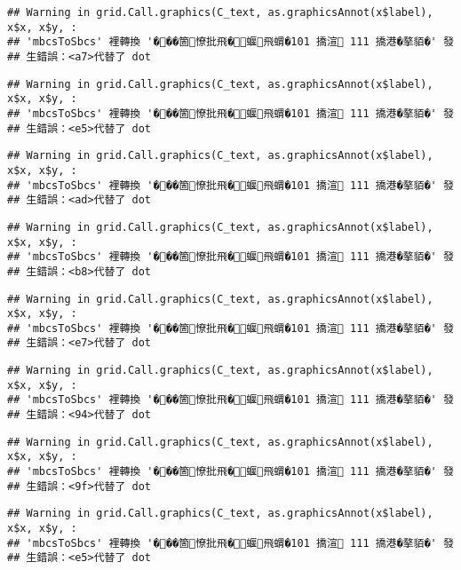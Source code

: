 \documentclass[
]{article}
\begin{document}
\begin{verbatim}
## Warning in grid.Call.graphics(C_text, as.graphicsAnnot(x$label), x$x, x$y, :
## 'mbcsToSbcs' 裡轉換 '���箇憭批飛�蝘飛蝟�101 撟渲 111 撟港�摮貊�' 發
## 生錯誤：<a7>代替了 dot
\end{verbatim}

\begin{verbatim}
## Warning in grid.Call.graphics(C_text, as.graphicsAnnot(x$label), x$x, x$y, :
## 'mbcsToSbcs' 裡轉換 '���箇憭批飛�蝘飛蝟�101 撟渲 111 撟港�摮貊�' 發
## 生錯誤：<e5>代替了 dot
\end{verbatim}

\begin{verbatim}
## Warning in grid.Call.graphics(C_text, as.graphicsAnnot(x$label), x$x, x$y, :
## 'mbcsToSbcs' 裡轉換 '���箇憭批飛�蝘飛蝟�101 撟渲 111 撟港�摮貊�' 發
## 生錯誤：<ad>代替了 dot
\end{verbatim}

\begin{verbatim}
## Warning in grid.Call.graphics(C_text, as.graphicsAnnot(x$label), x$x, x$y, :
## 'mbcsToSbcs' 裡轉換 '���箇憭批飛�蝘飛蝟�101 撟渲 111 撟港�摮貊�' 發
## 生錯誤：<b8>代替了 dot
\end{verbatim}

\begin{verbatim}
## Warning in grid.Call.graphics(C_text, as.graphicsAnnot(x$label), x$x, x$y, :
## 'mbcsToSbcs' 裡轉換 '���箇憭批飛�蝘飛蝟�101 撟渲 111 撟港�摮貊�' 發
## 生錯誤：<e7>代替了 dot
\end{verbatim}

\begin{verbatim}
## Warning in grid.Call.graphics(C_text, as.graphicsAnnot(x$label), x$x, x$y, :
## 'mbcsToSbcs' 裡轉換 '���箇憭批飛�蝘飛蝟�101 撟渲 111 撟港�摮貊�' 發
## 生錯誤：<94>代替了 dot
\end{verbatim}

\begin{verbatim}
## Warning in grid.Call.graphics(C_text, as.graphicsAnnot(x$label), x$x, x$y, :
## 'mbcsToSbcs' 裡轉換 '���箇憭批飛�蝘飛蝟�101 撟渲 111 撟港�摮貊�' 發
## 生錯誤：<9f>代替了 dot
\end{verbatim}

\begin{verbatim}
## Warning in grid.Call.graphics(C_text, as.graphicsAnnot(x$label), x$x, x$y, :
## 'mbcsToSbcs' 裡轉換 '���箇憭批飛�蝘飛蝟�101 撟渲 111 撟港�摮貊�' 發
## 生錯誤：<e5>代替了 dot
\end{verbatim}
\end{document}
